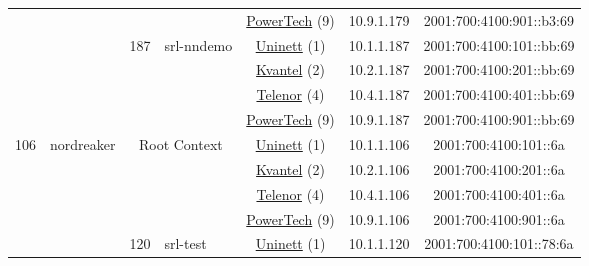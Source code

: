 \begin{small}
\begin{center}
\begin{longtable}{|c|c|c|c|c|c|c|c|}
  &  &  &  & \multicolumn{2}{|c|}{\tiny{\href{http://www.powertech.no}{PowerTech} (9)}} & \tiny{10.9.1.179} & \tiny{2001:700:4100:901::b3:69} \\* \cline{3-3}\cline{4-4}\cline{5-5}\cline{6-6}\cline{7-7}\cline{8-8}
  &  & \multirow{4}{*}{\tiny{187}} & \multicolumn{1}{|l|}{\multirow{4}{*}{\tiny{srl-nndemo}}} & \multicolumn{2}{|c|}{\tiny{\href{https://www.uninett.no}{Uninett} (1)}} & \tiny{10.1.1.187} & \tiny{2001:700:4100:101::bb:69} \\* \cline{5-5}\cline{6-6}\cline{7-7}\cline{8-8}
  &  &  &  & \multicolumn{2}{|c|}{\tiny{\href{http://kvantel.no}{Kvantel} (2)}} & \tiny{10.2.1.187} & \tiny{2001:700:4100:201::bb:69} \\* \cline{5-5}\cline{6-6}\cline{7-7}\cline{8-8}
  &  &  &  & \multicolumn{2}{|c|}{\tiny{\href{https://www.telenor.no}{Telenor} (4)}} & \tiny{10.4.1.187} & \tiny{2001:700:4100:401::bb:69} \\* \cline{5-5}\cline{6-6}\cline{7-7}\cline{8-8}
  &  &  &  & \multicolumn{2}{|c|}{\tiny{\href{http://www.powertech.no}{PowerTech} (9)}} & \tiny{10.9.1.187} & \tiny{2001:700:4100:901::bb:69} \\ \hline
 \multirow{32}{*}{\tiny{106}} & \multicolumn{1}{|l|}{\multirow{32}{*}{\tiny{nordreaker}}} & \multicolumn{2}{|c|}{\multirow{4}{*}{\tiny{Root Context}}} & \multicolumn{2}{|c|}{\tiny{\href{https://www.uninett.no}{Uninett} (1)}} & \tiny{10.1.1.106} & \tiny{2001:700:4100:101::6a} \\* \cline{5-5}\cline{6-6}\cline{7-7}\cline{8-8}
  &  & \multicolumn{2}{|c|}{} & \multicolumn{2}{|c|}{\tiny{\href{http://kvantel.no}{Kvantel} (2)}} & \tiny{10.2.1.106} & \tiny{2001:700:4100:201::6a} \\* \cline{5-5}\cline{6-6}\cline{7-7}\cline{8-8}
  &  & \multicolumn{2}{|c|}{} & \multicolumn{2}{|c|}{\tiny{\href{https://www.telenor.no}{Telenor} (4)}} & \tiny{10.4.1.106} & \tiny{2001:700:4100:401::6a} \\* \cline{5-5}\cline{6-6}\cline{7-7}\cline{8-8}
  &  & \multicolumn{2}{|c|}{} & \multicolumn{2}{|c|}{\tiny{\href{http://www.powertech.no}{PowerTech} (9)}} & \tiny{10.9.1.106} & \tiny{2001:700:4100:901::6a} \\* \cline{3-3}\cline{4-4}\cline{5-5}\cline{6-6}\cline{7-7}\cline{8-8}
  &  & \multirow{4}{*}{\tiny{120}} & \multicolumn{1}{|l|}{\multirow{4}{*}{\tiny{srl-test}}} & \multicolumn{2}{|c|}{\tiny{\href{https://www.uninett.no}{Uninett} (1)}} & \tiny{10.1.1.120} & \tiny{2001:700:4100:101::78:6a} \\* \cline{5-5}\cline{6-6}\cline{7-7}\cline{8-8}

\end{longtable}
\end{center}
\end{small}
